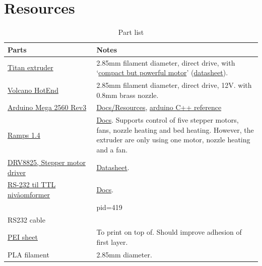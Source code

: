 \documentclass[10pt]{article}
\newcommand{\tabrowA}{\rowcolor{tabrowcolorA}}
\begin{document}
\section{Resources}
\begin{table}[h]
	\centering
	{
	\captionsetup{width=\linewidth}
	\caption{Part list}
	\label{}
	}
	\vspace{-0.6em}
	\setlength\tabcolsep{6pt} %
	\begin{tabular}{p{0.35\linewidth}p{0.65\linewidth}}
	\toprule
	Parts & Notes \\
	\midrule
	\tabrowA \href{https://e3d-online.com/products/titan-extruder}{Titan extruder} & 2.85mm filament diameter, direct drive, with `\href{https://e3d-online.com/products/motors}{compact but powerful motor}' (\href{https://e3d-online.zendesk.com/hc/en-us/article_attachments/360016616377/Compact_But_Powerful_Motor.pdf}{datasheet}). \\
	\href{https://e3d-online.com/products/volcano-hotend}{Volcano HotEnd} & 2.85mm filament diameter, direct drive, 12V. with 0.8mm brass nozzle.  \\
	\tabrowA \href{https://store.arduino.cc/products/arduino-mega-2560-rev3}{Arduino Mega 2560 Rev3} & \href{https://docs.arduino.cc/hardware/mega-2560}{Docs/Resources}, \href{https://www.arduino.cc/reference/en/}{arduino C++ reference} \\
	\href{https://www.electrokit.com/produkt/ramps-1-4-shield}{Ramps 1.4} & \href{https://reprap.org/wiki/RAMPS_1.4}{Docs}. Supports control of five stepper motors, fans, nozzle heating and bed heating. However, the extruder are only using one motor, nozzle heating and a fan. \\
	\tabrowA \href{https://www.electrokit.com/produkt/stegmotordrivare-drv8825/}{DRV8825, Stepper motor driver} & \href{https://www.electrokit.com/uploads/productfile/41016/drv8825.pdf}{Datasheet}. \\
	\href{https://www.sparkfun.com/products/449}{RS-232 til TTL nivåomformer} & \href{https://github.com/sparkfun/RS232_Shifter_SMD}{Docs}. \\
	\tabrowA \href{http://www.sunrichtech.com.hk/ProductShow.aspx?Mid=1&pid=419}{PCIe RS232 computer card} &  \\
	RS232 cable &  \\
	\tabrowA \href{https://www.e3printable.no/nettbutikk-norge/83-byggeplate/345-pei-byggeplate/?variantId=215}{PEI sheet} & To print on top of. Should improve adhesion of first layer. \\
	PLA filament & 2.85mm diameter. \\
	\bottomrule
	\end{tabular}
\end{table}
\end{document}
